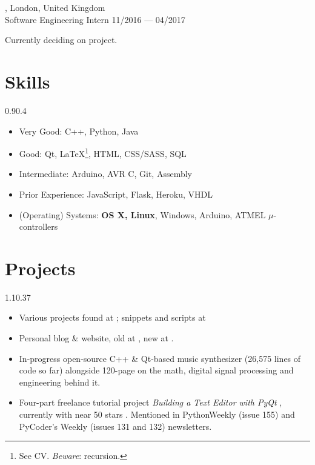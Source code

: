 \begin{entry}
	{, London, United Kingdom}
	{\\Software Engineering Intern}
	{11/2016 --- 04/2017}
	\item Currently deciding on project.
\end{entry}

\section{Skills}{0.9}{0.4}
\vspace{-2mm}
\begin{multicols}{2}
	\begin{itemize}
		\item Very Good: C++, Python, Java
		\item Good: Qt, \LaTeX\footnote{See CV. \emph{Beware}: recursion.}, HTML,
      CSS/SASS, SQL
		\item Intermediate: Arduino, AVR C, Git, Assembly
		\item Prior Experience: JavaScript, Flask, Heroku, VHDL
		\item (Operating) Systems: \textbf{OS X, Linux}, Windows, Arduino, ATMEL $\mu$-controllers
	\end{itemize}
\end{multicols}

\section{Projects}{1.1}{0.37}
\vspace{-5mm}
\begin{itemize}
	\item Various projects found at
	; snippets and scripts at 
	\item Personal blog \& website, old at , new at .
	\item In-progress open-source C++ \& Qt-based music synthesizer
     (26,575
    lines of code so far) alongside 120-page  on the math, digital signal processing and
    engineering behind it.
	\item Four-part freelance tutorial project \emph{Building a Text Editor with PyQt} , currently with near 50 stars . Mentioned in PythonWeekly (issue 155) and PyCoder's Weekly (issues 131 and 132) newsletters.
\end{itemize}

